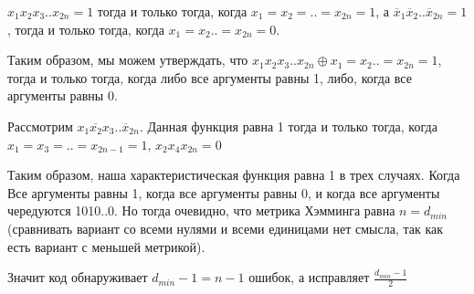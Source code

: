 \documentclass[../main.tex]{subfiles}
\begin{document}
$x_1x_2x_3..x_{2n}=1$ тогда и только тогда, когда $x_1=x_2=..=x_{2n}=1$, а $\overline{x}_1\overline{x}_2..\overline{x}_{2n}=1$, тогда и только тогда, когда $x_1=x_2..=x_{2n}=0$. 

Таким образом, мы можем утверждать, что $x_1x_2x_3..x_{2n} \oplus x_1=x_2..=x_{2n} = 1$, тогда и только тогда, когда либо все аргументы равны 1, либо, когда все аргументы равны 0.

Рассмотрим $x_1\overline{x_2}x_3..\overline{x}_{2n}$. Данная функция равна 1 тогда и только тогда, когда $x_1=x_3=..=x_{2n-1}=1$, $x_2x_4x_{2n}=0$

Таким образом, наша характеристическая функция равна 1 в трех случаях. Когда Все аргументы равны 1, когда все аргументы равны 0, и когда все аргументы чередуются 1010..0. Но тогда очевидно, что метрика Хэмминга равна $n=d_{min}$ (сравнивать вариант со всеми нулями и всеми единицами нет смысла, так как есть вариант с меньшей метрикой). 

Значит код обнаруживает $d_{min}-1=n-1$ ошибок, а исправляет $\frac{d_{min}-1}{2}$
\end{document}
